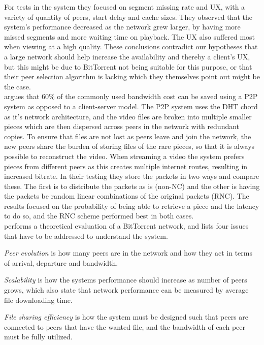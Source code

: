 For tests in the system they focused on segment missing rate and \ac{UX}, with a variety of quantity of peers, start delay and cache sizes. They observed that the system's performance decreased as the network grew larger, by having more missed segments and more waiting time on playback. The \ac{UX} also suffered most when viewing at a high quality. These conclusions contradict our hypotheses that a large network should help increase the availability and thereby a client's \ac{UX}, but this might be due to BitTorrent not being suitable for this purpose, or that their peer selection algorithm is lacking which they themselves point out might be the case.
\\


\citet{nguyen2009p2p} argues that 60\% of the commonly used bandwidth cost can be saved using a \ac{P2P} system as opposed to a client-server model. The \ac{P2P} system uses the \ac{DHT} chord as it's network architecture, and the video files are broken into multiple smaller pieces which are then dispersed across peers in the network with redundant copies. To ensure that files are not lost as peers leave and join the network, the new peers share the burden of storing files of the rare pieces, so that it is always possible to reconstruct the video. When streaming a video the system prefers pieces from different peers as this creates multiple internet routes, resulting in increased bitrate. In their testing they store the packets in two ways and compare these. The first is to distribute the packets as is (non-\ac{NC}) and the other is having the packets be random linear combinations of the original packets (\ac{RNC}). The results focused on the probability of being able to retrieve a piece and the latency to do so, and the \ac{RNC} scheme performed best in both cases.
\\


\citet{qiu2004modeling} performs a theoretical evaluation of a BitTorrent network, and lists four issues that have to be addressed to understand the system.

\emph{Peer evolution} is how many peers are in the network and how they act in terms of arrival, departure and bandwidth.

\emph{Scalability} is how the systems performance should increase as number of peers grows, which also state that network performance can be measured by average file downloading time.

\emph{File sharing efficiency} is how the system must be designed such that peers are connected to peers that have the wanted file, and the bandwidth of each peer must be fully utilized.

